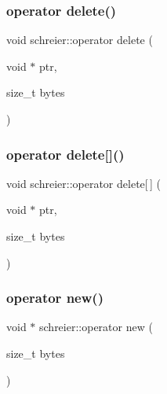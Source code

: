 \mbox{\label{classschreier_a4a23798df88ed8876770faedc091b858}} 
\subsubsection{\texorpdfstring{operator delete()}{operator delete()}}
{\footnotesize\ttfamily void schreier\+::operator delete (\begin{DoxyParamCaption}\item[{void $\ast$}]{ptr,  }\item[{size\+\_\+t}]{bytes }\end{DoxyParamCaption})}

\mbox{\label{classschreier_a402c6bf337fe87c2729220776020d2f1}} 
\subsubsection{\texorpdfstring{operator delete[]()}{operator delete[]()}}
{\footnotesize\ttfamily void schreier\+::operator delete\mbox{[}$\,$\mbox{]} (\begin{DoxyParamCaption}\item[{void $\ast$}]{ptr,  }\item[{size\+\_\+t}]{bytes }\end{DoxyParamCaption})}

\mbox{\label{classschreier_a37f34367973fd790fac4a4e8d5aafff5}} 
\subsubsection{\texorpdfstring{operator new()}{operator new()}}
{\footnotesize\ttfamily void $\ast$ schreier\+::operator new (\begin{DoxyParamCaption}\item[{size\+\_\+t}]{bytes }\end{DoxyParamCaption})}

\mbox{\label{classschreier_a9cfbb1bf282b35b534502fbdf0973b44}} 
